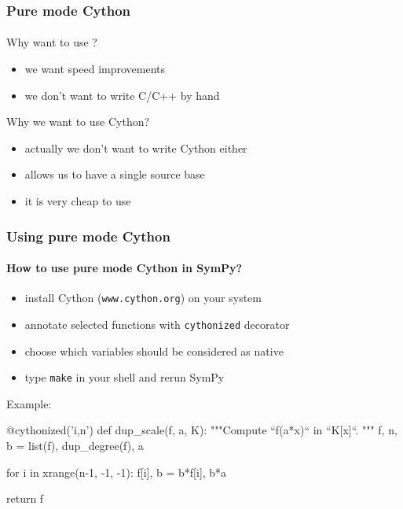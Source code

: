 \documentclass[10pt,polish]{beamer}
\begin{document}
\begin{frame}[fragile]
    \frametitle{Pure mode Cython}
    \framesubtitle{}

    Why want to use ?
    \begin{itemize}
        \item we want speed improvements
        \item we don't want to write C/C++ by hand
    \end{itemize}
    \pause
    Why we want to use  Cython?
    \begin{itemize}
        \item actually we don't want to write Cython either
        \item allows us to have a single source base
        \item it is very cheap to use
    \end{itemize}
\end{frame}

\begin{frame}[fragile]
    \frametitle{Using pure mode Cython}
    \framesubtitle{How to use pure mode Cython in SymPy?}

    \begin{itemize}
        \item install Cython (\texttt{www.cython.org}) on your system
        \pause
        \item annotate selected functions with \texttt{cythonized} decorator
        \pause
        \item choose which variables should be considered as native
        \pause
        \item type \texttt{make} in your shell and rerun SymPy
    \end{itemize}
    \pause
    Example:
    \begin{python}
@cythonized('i,n')
def dup_scale(f, a, K):
    """Compute ``f(a*x)`` in ``K[x]``. """
    f, n, b = list(f), dup_degree(f), a

    for i in xrange(n-1, -1, -1):
        f[i], b = b*f[i], b*a

    return f
    \end{python}
\end{frame}
\end{document}
